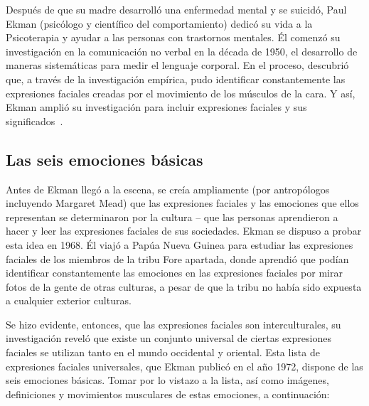 Después de que su madre desarrolló una enfermedad mental y se suicidó, Paul Ekman (psicólogo y científico del comportamiento) dedicó su vida a la Psicoterapia y ayudar a las personas con trastornos mentales. Él comenzó su investigación en la comunicación no verbal en la década de 1950, el desarrollo de maneras sistemáticas para medir el lenguaje corporal. En el proceso, descubrió que, a través de la investigación empírica, pudo identificar constantemente las expresiones faciales creadas por el movimiento de los músculos de la cara. Y así, Ekman amplió su investigación para incluir expresiones faciales y sus significados~\cite{29ekman2016scientists}.


\subsection{Las seis emociones básicas}
Antes de Ekman llegó a la escena, se creía ampliamente (por antropólogos incluyendo Margaret Mead) que las expresiones faciales y las emociones que ellos representan se determinaron por la cultura – que las personas aprendieron a hacer y leer las expresiones faciales de sus sociedades. Ekman se dispuso a probar esta idea en 1968. Él viajó a Papúa Nueva Guinea para estudiar las expresiones faciales de los miembros de la tribu Fore apartada, donde aprendió que podían identificar constantemente las emociones en las expresiones faciales por mirar fotos de la gente de otras culturas, a pesar de que la tribu no había sido expuesta a cualquier exterior culturas.

Se hizo evidente, entonces, que las expresiones faciales son interculturales, su investigación reveló que existe un conjunto universal de ciertas expresiones faciales se utilizan tanto en el mundo occidental y oriental. Esta lista de expresiones faciales universales, que Ekman publicó en el año 1972, dispone de las seis emociones básicas. Tomar por lo vistazo a la lista, así como imágenes, definiciones y movimientos musculares de estas emociones, a continuación:

